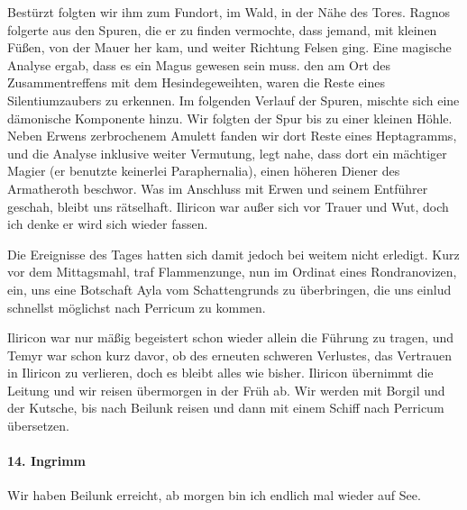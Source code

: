 Bestürzt folgten wir ihm zum Fundort, im Wald, in der Nähe des Tores. Ragnos folgerte aus den Spuren, die er zu finden vermochte, dass jemand, mit kleinen Füßen, von der Mauer her kam, und weiter Richtung Felsen ging. Eine magische Analyse ergab, dass es ein Magus gewesen sein muss. den am Ort des Zusammentreffens mit dem Hesindegeweihten, waren die Reste eines Silentiumzaubers zu erkennen. Im folgenden Verlauf der Spuren, mischte sich eine dämonische Komponente hinzu. Wir folgten der Spur bis zu einer kleinen Höhle. Neben Erwens zerbrochenem Amulett fanden wir dort Reste eines Heptagramms, und die Analyse inklusive weiter Vermutung, legt nahe, dass dort ein mächtiger Magier (er benutzte keinerlei Paraphernalia), einen höheren Diener des Armatheroth beschwor. Was im Anschluss mit Erwen und seinem Entführer geschah, bleibt uns rätselhaft. Iliricon war außer sich vor Trauer und Wut, doch ich denke er wird sich wieder fassen.

Die Ereignisse des Tages hatten sich damit jedoch bei weitem nicht erledigt. Kurz vor dem Mittagsmahl, traf Flammenzunge, nun im Ordinat eines Rondranovizen, ein, uns eine Botschaft Ayla vom Schattengrunds zu überbringen, die uns einlud schnellst möglichst nach Perricum zu kommen.

Iliricon war nur mäßig begeistert schon wieder allein die Führung zu tragen, und Temyr war schon kurz davor, ob des erneuten schweren Verlustes, das Vertrauen in Iliricon zu verlieren, doch es bleibt alles wie bisher. Iliricon übernimmt die Leitung und wir reisen übermorgen in der Früh ab. Wir werden mit Borgil und der Kutsche, bis nach Beilunk reisen und dann mit einem Schiff nach Perricum übersetzen.

\paragraph{14. Ingrimm}
Wir haben Beilunk erreicht, ab morgen bin ich endlich mal wieder auf See.

